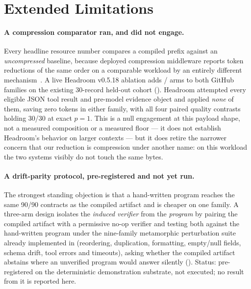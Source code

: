 \begin{table}[t]
  \centering
  \caption{Gate-behaviour inventory from the retained threshold analysis. A
  partial frontier would show graded coverage as the threshold changes; none
  appears among the seven current registered artifacts.}
  \label{tab:gate-profile}
  \footnotesize
  \setlength{\tabcolsep}{4pt}
  
\end{table}

\section{Extended Limitations}
\label{app:limits}

\paragraph{A compression comparator ran, and did not engage.}
Every headline resource number compares a compiled prefix against an
\emph{uncompressed} baseline, because deployed compression middleware reports
token reductions of the same order on a comparable workload by an entirely
different mechanism~\citep{headroom2026}. A live Headroom v0.5.18 ablation adds
/ arms to both GitHub families on
the existing 30-record held-out cohort
(). Headroom attempted
every eligible JSON tool result and pre-model evidence object and applied
\emph{none} of them, saving zero tokens in either family, with all four paired
quality contrasts holding 30/30 at exact $p{=}1$. This is a null engagement at
this payload shape, not a measured composition or a measured floor --- it does
not establish Headroom's behavior on larger contexts --- but it does retire the
narrower concern that our reduction is compression under another name: on this
workload the two systems visibly do not touch the same bytes.

\paragraph{A drift-parity protocol, pre-registered and not yet run.}
The strongest standing objection is that a hand-written program reaches the
same 90/90 contracts as the compiled artifact and is cheaper on one family. A
three-arm design isolates the \emph{induced verifier} from the \emph{program}
by pairing the compiled artifact with a permissive no-op verifier and testing
both against the hand-written program under the nine-family metamorphic
perturbation suite already implemented in 
(reordering, duplication, formatting, empty/null fields, schema drift, tool
errors and timeouts), asking whether the compiled artifact abstains where an
unverified program would answer silently
(). Status:
pre-registered on the deterministic demonstration substrate, not executed; no
result from it is reported here.

